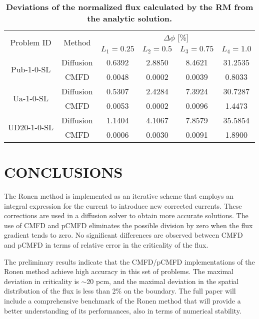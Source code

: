 \documentclass[letterpaper]{mc2021}
\begin{document}
\vspace{-5.0mm}
\begin{table}[htb]
	\vspace{-5.5mm}
	\centering	
	\caption{\bf Deviations of the normalized flux calculated by the RM from the analytic solution.}
	\label{table:res2} 
	\small
	\begin{tabular}{|c|c|c|c|c|c|} \hline 
	\multirow{2}{*}{Problem ID} & \multirow{2}{*}{Method} & \multicolumn{4}{c|}{$\Delta\phi$ [\%]}  \\
	\cline{3-6}
	& & $L_1 = 0.25$ & $L_2 = 0.5$ & $L_3 = 0.75$ & $L_4 = 1.0$  \\
	\hline
	\multirow{2}{*}{Pub-1-0-SL} & Diffusion  & 0.6392 & 2.8850 & 8.4621 & 31.2535  \\
	\cline{2-6}
	$(I=100)$ & CMFD 	     & 0.0048 & 0.0002 & 0.0039 & 0.8033  \\ \hline
	\multirow{2}{*}{Ua-1-0-SL}  & Diffusion  & 0.5307 & 2.4284 & 7.3924 & 30.7287 \\
	\cline{2-6} 
	$(I=100)$ & CMFD       & 0.0053 & 0.0002 & 0.0096 & 1.4473  \\ \hline 
	\multirow{2}{*}{UD20-1-0-SL} & Diffusion & 1.1404 & 4.1067 & 7.8579 & 35.5854  \\ 
	\cline{2-6} 		
	$(I=200)$& CMFD      & 0.0006 & 0.0030 & 0.0091 & 1.8900  \\ \hline 		
\end{tabular}
\vspace{-5.0mm}
\end{table}

\vspace{-6.5mm}

\section{CONCLUSIONS}

The Ronen method is implemented as an iterative scheme that employs an integral expression for the current to introduce new corrected currents. These corrections are used in a diffusion solver to obtain more accurate solutions. The use of CMFD and pCMFD eliminates the possible division by zero when the flux gradient tends to zero. No significant differences are observed between CMFD and pCMFD in terms of relative error in the criticality of the flux. 

\vspace{-1.5mm}

The preliminary results indicate that the CMFD/pCMFD implementations of the Ronen method achieve high accuracy in this set of problems. The maximal deviation in criticality is $\sim$20 pcm, and the maximal deviation in the spatial distribution of the flux is less than 2\% on the boundary.  
%
The full paper will include a comprehensive benchmark of the Ronen method that will provide a better understanding of its performances, also in terms of numerical stability.
\end{document}
